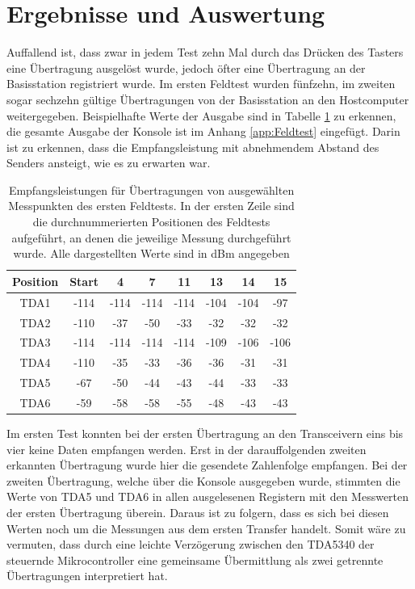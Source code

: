 \section{Ergebnisse und Auswertung}
Auffallend ist, dass zwar in jedem Test zehn Mal durch das Drücken des Tasters eine Übertragung ausgelöst wurde, jedoch öfter eine Übertragung an der Basisstation registriert wurde. Im ersten Feldtest wurden fünfzehn, im zweiten sogar sechzehn gültige Übertragungen von der Basisstation an den Hostcomputer weitergegeben. Beispielhafte Werte der Ausgabe sind in Tabelle \ref{tab:gemesseneWerte} zu erkennen, die gesamte Ausgabe der Konsole ist im  Anhang \ref{app:Feldtest} eingefügt. Darin ist zu erkennen, dass die Empfangsleistung mit abnehmendem Abstand des Senders ansteigt, wie es zu erwarten war.


\begin{table}
	\centering
	\begin{tabular}{c|ccccccc}
		Position & Start & 4 & 7 & 11 & 13 & 14 & 15 \\ 
		\hline
		TDA1 & -114 & -114 & -114 & -114 & -104 & -104 & -97 \\ 
		TDA2 & -110 & -37 & -50 & -33 & -32 & -32 & -32 \\ 
		TDA3 & -114 & -114 & -114 & -114 & -109 & -106 & -106 \\ 
		TDA4 & -110 & -35 & -33 & -36 & -36 & -31 & -31 \\ 
		TDA5 & -67 & -50 & -44 & -43 & -44 & -33 & -33 \\ 
		TDA6 & -59 & -58 & -58 & -55 & -48 & -43 & -43 \\ 
	\end{tabular} 
	\caption[Beispielhafte Empfangsleistungen des ersten Feldtests]{Empfangsleistungen für Übertragungen von ausgewählten Messpunkten des ersten Feldtests. In der ersten Zeile sind die durchnummerierten Positionen des Feldtests aufgeführt, an denen die jeweilige Messung durchgeführt wurde. Alle dargestellten Werte sind in dBm angegeben}
	\label{tab:gemesseneWerte}
\end{table}


Im ersten Test konnten bei der ersten Übertragung an den Transceivern eins bis vier keine Daten empfangen  werden. Erst in der darauffolgenden zweiten erkannten Übertragung wurde hier die gesendete Zahlenfolge empfangen. Bei der zweiten Übertragung, welche über die Konsole ausgegeben wurde, stimmten die Werte von TDA5 und TDA6 in allen ausgelesenen Registern mit den Messwerten der ersten Übertragung überein.  Daraus ist zu folgern, dass es sich bei diesen Werten noch um die Messungen aus dem ersten Transfer handelt. Somit wäre zu vermuten, dass durch eine leichte Verzögerung zwischen den TDA5340 der steuernde Mikrocontroller eine gemeinsame Übermittlung als zwei getrennte Übertragungen interpretiert hat.

